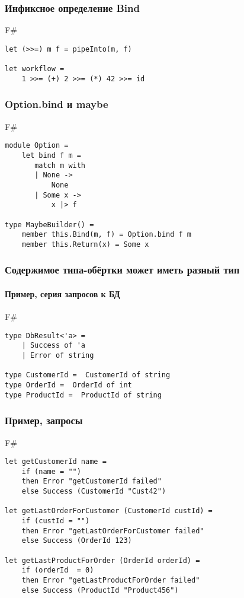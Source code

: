 \documentclass[xetex,mathserif,serif]{beamer}
\begin{document}
	\begin{frame}[fragile]
		\frametitle{Инфиксное определение Bind}
   		\begin{exampleblock}{F\#}
   			\begin{lstlisting}
let (>>=) m f = pipeInto(m, f)

let workflow = 
    1 >>= (+) 2 >>= (*) 42 >>= id
\end{lstlisting}
\end{exampleblock}
\end{frame}

	\begin{frame}[fragile]
		\frametitle{Option.bind и maybe}
   		\begin{exampleblock}{F\#}
   			\begin{lstlisting}
module Option = 
    let bind f m =
       match m with
       | None -> 
           None
       | Some x -> 
           x |> f 

type MaybeBuilder() =
    member this.Bind(m, f) = Option.bind f m
    member this.Return(x) = Some x
\end{lstlisting}
\end{exampleblock}
\end{frame}

	\begin{frame}[fragile]
		\frametitle{Содержимое типа-обёртки может иметь разный тип}
		\framesubtitle{Пример, серия запросов к БД}
   		\begin{exampleblock}{F\#}
   			\begin{lstlisting}
type DbResult<'a> = 
    | Success of 'a
    | Error of string

type CustomerId =  CustomerId of string
type OrderId =  OrderId of int
type ProductId =  ProductId of string
\end{lstlisting}
\end{exampleblock}
\end{frame}

	\begin{frame}[fragile]
		\frametitle{Пример, запросы}
   		\begin{exampleblock}{F\#}
   			\begin{lstlisting}
let getCustomerId name =
    if (name = "") 
    then Error "getCustomerId failed"
    else Success (CustomerId "Cust42")

let getLastOrderForCustomer (CustomerId custId) =
    if (custId = "") 
    then Error "getLastOrderForCustomer failed"
    else Success (OrderId 123)

let getLastProductForOrder (OrderId orderId) =
    if (orderId  = 0) 
    then Error "getLastProductForOrder failed"
    else Success (ProductId "Product456")
\end{lstlisting}
\end{exampleblock}
\end{frame}
\end{document}
